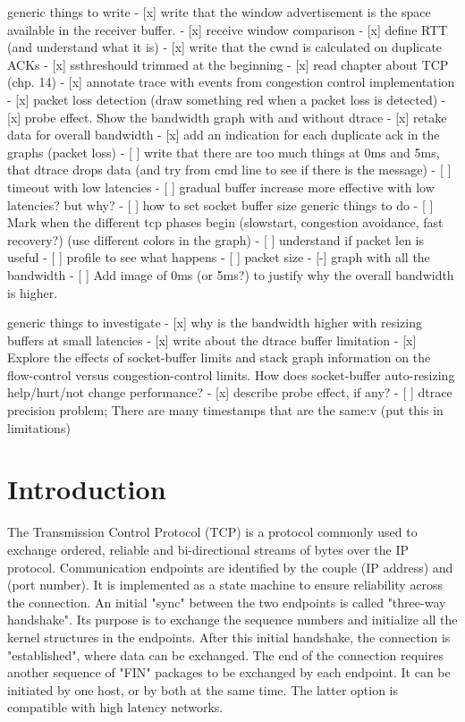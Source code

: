 \documentclass[a4paper,10pt]{article}
\begin{document}
generic things to write
- [x] write that the window advertisement is the space available in the receiver buffer.
- [x] receive window comparison
- [x] define RTT (and understand what it is)
- [x] write that the cwnd is calculated on duplicate ACKs
- [x] ssthreshould trimmed at the beginning
- [x] read chapter about TCP (chp. 14)
- [x] annotate trace with events from congestion control implementation
- [x] packet loss detection (draw something red when a packet loss is detected)
- [x] probe effect. Show the bandwidth graph with and without dtrace
- [x] retake data for overall bandwidth
- [x] add an indication for each duplicate ack in the graphs (packet loss)
- [ ] write that there are too much things at 0ms and 5ms, that dtrace drops data (and try from cmd line to see if there is the message)
- [ ] timeout with low latencies
- [ ] gradual buffer increase more effective with low latencies? but why?
- [ ] how to set socket buffer size
generic things to do 
- [ ] Mark when  the different tcp phases begin (slowstart, congestion avoidance, fast recovery?) (use different colors in the graph)
- [ ] understand if packet len is useful
- [ ] profile to see what happens
- [ ] packet size
- [-] graph with all the bandwidth
- [ ] Add image of 0ms (or 5ms?) to justify why the overall bandwidth is higher.

generic things to investigate
- [x] why is the bandwidth higher with resizing buffers at small latencies
- [x] write about the dtrace buffer limitation
- [x] Explore the effects of socket-buffer limits and stack graph information on the flow-control versus congestion-control limits. How does socket-buffer auto-resizing help/hurt/not change performance? 
- [x] describe probe effect, if any?
- [ ] dtrace precision problem; There are many timestamps that are the same:v (put this in limitations)
\fi

\clearpage

\setcounter{page}{1}

\section{Introduction}
The Transmission Control Protocol (TCP) is a protocol commonly used to exchange ordered, reliable and bi-directional streams of bytes over the IP protocol. Communication endpoints are identified by the couple (IP address) and (port number). 
It is implemented as a state machine to ensure reliability across the connection. An initial "sync" between the two endpoints is called "three-way handshake". Its purpose is to exchange the sequence numbers and initialize all the kernel structures in the endpoints.
After this initial handshake, the connection is "established", where data can be exchanged.
The end of the connection requires another sequence of "FIN" packages to be exchanged by each endpoint. It can be initiated by one host, or by both at the same time. The latter option is compatible with high latency networks.
\end{document}
